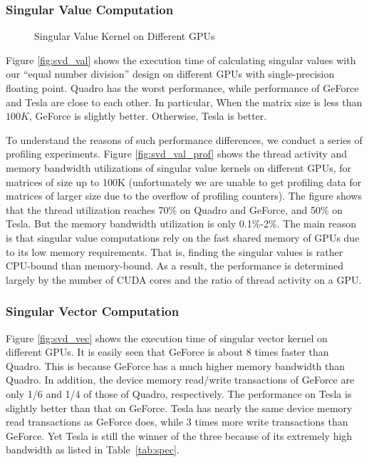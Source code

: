 \subsubsection{Singular Value Computation}
\begin{figure}[hbpt]
\vspace{-0.3in}
\centering
\vspace{-0.1in}
  \caption{Singular Value Kernel on Different GPUs}
  \label{fig:svdval}
\vspace{-0.3in}
\end{figure}

Figure \ref{fig:svd_val} shows the execution time of calculating singular values with our ``equal number division'' design on different GPUs with single-precision floating point.
Quadro has the worst performance, while performance of GeForce and Tesla are close to each other.
In particular, When the matrix size is less than $100K$, GeForce is slightly better. Otherwise, Tesla is better. 

To understand the reasons
of such performance differences, we conduct a series of profiling experiments.
Figure \ref{fig:svd_val_prof} shows the thread activity and memory bandwidth utilizations of singular value kernels on different GPUs, for matrices of size up to 
100K (unfortunately we are unable to get profiling data for matrices of larger size due to the overflow of profiling counters). 
The figure shows that the thread utilization reaches 70\% on Quadro and GeForce, and 50\% on Tesla. 
But the memory bandwidth utilization is only 0.1\%-2\%.
The main reason is that singular value computations rely on the fast shared memory
of GPUs due to its low memory requirements. That is, finding the singular
values is rather CPU-bound than memory-bound. 
As a result, the performance is determined largely by the number of CUDA cores and the ratio of thread activity on a GPU.

\subsubsection{Singular Vector Computation}
Figure \ref{fig:svd_vec} shows the execution time of singular vector kernel on different GPUs. 
It is easily seen that GeForce is about 8 times faster than
Quadro. This is because GeForce has a much higher memory bandwidth
than Quadro.
In addition, the device memory read/write transactions of GeForce are only 1/6 and 1/4 of those of Quadro, respectively.
The performance on Tesla is slightly better than that on GeForce.
Tesla has nearly the same device memory read transactions as GeForce does, while 3 times more write transactions than GeForce.
Yet Tesla is still the winner of the three because of its extremely high
bandwidth as listed in Table~\ref{tab:spec}.

